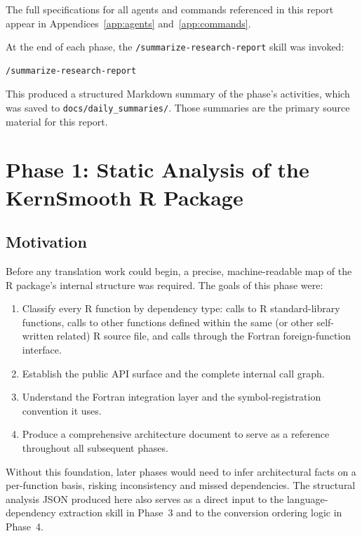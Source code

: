 \documentclass[12pt,a4paper]{article}
\begin{document}
The full specifications for all agents and commands referenced in this report appear in Appendices~\ref{app:agents} and~\ref{app:commands}.

At the end of each phase, the \texttt{/summarize-research-report} skill was invoked:
\begin{lstlisting}[style=shell]
/summarize-research-report
\end{lstlisting}
This produced a structured Markdown summary of the phase's activities, which was saved to \texttt{docs/daily\_summaries/}. Those summaries are the primary source material for this report.

\section{Phase 1: Static Analysis of the KernSmooth R Package}

\subsection{Motivation}

Before any translation work could begin, a precise, machine-readable map of the R package's internal structure was required. The goals of this phase were:

\begin{enumerate}
  \item Classify every R function by dependency type: calls to R standard-library functions, calls to other functions defined within the same (or other self-written related) R source file, and calls through the Fortran foreign-function interface.
  \item Establish the public API surface and the complete internal call graph.
  \item Understand the Fortran integration layer and the symbol-registration convention it uses.
  \item Produce a comprehensive architecture document to serve as a reference throughout all subsequent phases.
\end{enumerate}

Without this foundation, later phases would need to infer architectural facts on a per-function basis, risking inconsistency and missed dependencies. The structural analysis JSON produced here also serves as a direct input to the language-dependency extraction skill in Phase~3 and to the conversion ordering logic in Phase~4.
\end{document}
